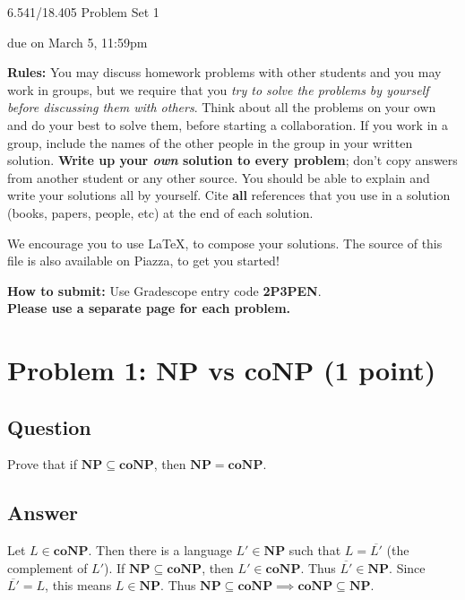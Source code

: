 \documentclass{article}
\newcommand{\NP}{\mathbf{NP}}
\newcommand{\coNP}{\mathbf{coNP}}
\begin{document}
	
	
	\begin{center}
		\Large
		6.541/18.405 Problem Set 1
		
		\vspace{3pt}
		\normalsize
		due on March 5, 11:59pm
	\end{center}
	
	{\bf Rules:} You may discuss homework problems with other students and you may work in groups, but we require that you {\em try to solve the problems by yourself before discussing them with others}. Think about all the problems on your own and do your best to solve them, before starting a collaboration. If you work in a group, include the names of the other people in the group in your written solution. {\bf Write up your {\em own} solution to every problem}; don't copy answers from another student or any other source. You should be able to explain and write your solutions all by yourself. Cite {\bf all} references that you use in a solution (books, papers, people, etc) at the end of each solution. 
	
	We encourage you to use \LaTeX, to compose your solutions. The source of this file is also available on Piazza, to get you started!
	
	{\bf How to submit:} Use Gradescope entry code \textbf{2P3PEN}.\\ \textbf{Please use a separate page for each problem.} 

\newpage
\section*{Problem 1: NP vs coNP (1 point)}

\subsection*{Question}

Prove that if $\NP \subseteq \coNP$, then $\NP = \coNP$.

\subsection*{Answer}

Let $L \in \coNP$.  Then there is a language $L' \in \NP$
such that $L = \overline{L'}$ (the complement of $L'$).
If $\NP \subseteq \coNP$, then $L' \in \coNP$.
Thus $\overline{L'} \in \NP$.  Since $\overline{L'} = L$, this means
$L \in \NP$. Thus $\NP \subseteq \coNP \implies \coNP \subseteq \NP$.
\end{document}
